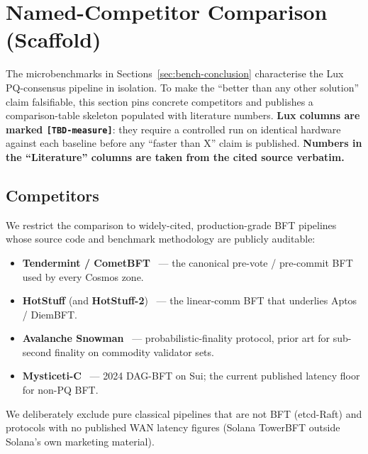 \section{Named-Competitor Comparison (Scaffold)}
\label{sec:named-competitors}

The microbenchmarks in Sections~\ref{sec:bench-conclusion} characterise the
Lux PQ-consensus pipeline in isolation. To make the ``better than any other
solution'' claim falsifiable, this section pins concrete competitors and
publishes a comparison-table skeleton populated with literature numbers.
\textbf{Lux columns are marked \texttt{[TBD-measure]}}: they require a
controlled run on identical hardware against each baseline before any
``faster than X'' claim is published. \textbf{Numbers in the
``Literature'' columns are taken from the cited source verbatim.}

\subsection{Competitors}

We restrict the comparison to widely-cited, production-grade BFT pipelines
whose source code and benchmark methodology are publicly auditable:

\begin{itemize}[leftmargin=2em,nosep]
  \item \textbf{Tendermint / CometBFT}~\cite{buchman2016tendermint,cometbftgithub}
        --- the canonical pre-vote / pre-commit BFT used by every Cosmos zone.
  \item \textbf{HotStuff} (and \textbf{HotStuff-2})~\cite{yin2019hotstuff,malkhi2023hotstuff2}
        --- the linear-comm BFT that underlies Aptos / DiemBFT.
  \item \textbf{Avalanche Snowman}~\cite{rocket2019avalanche,amores2024avalanche}
        --- probabilistic-finality protocol, prior art for sub-second
        finality on commodity validator sets.
  \item \textbf{Mysticeti-C}~\cite{babel2024mysticeti} --- 2024 DAG-BFT
        on Sui; the current published latency floor for non-PQ BFT.
\end{itemize}

We deliberately exclude pure classical pipelines that are not BFT
(etcd-Raft) and protocols with no published WAN latency figures (Solana
TowerBFT outside Solana's own marketing material).

